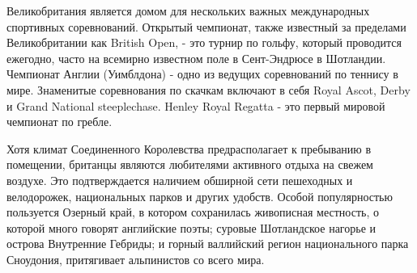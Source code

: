 Великобритания является домом для нескольких важных международных спортивных соревнований. Открытый чемпионат, также известный за пределами Великобритании как British Open, - это турнир по гольфу, который проводится ежегодно, часто на всемирно известном поле в Сент-Эндрюсе в Шотландии. Чемпионат Англии (Уимблдона) - одно из ведущих соревнований по теннису в мире. Знаменитые соревнования по скачкам включают в себя Royal Ascot, Derby и Grand National steeplechase. Henley Royal Regatta - это первый мировой чемпионат по гребле.

Хотя климат Соединенного Королевства предрасполагает к пребыванию в помещении, британцы являются любителями активного отдыха на свежем воздухе. Это подтверждается наличием обширной сети пешеходных и велодорожек, национальных парков и других удобств. Особой популярностью пользуется Озерный край, в котором сохранилась живописная местность, о которой много говорят английские поэты; суровые Шотландское нагорье и острова Внутренние Гебриды; и горный валлийский регион национального парка Сноудония, притягивает альпинистов со всего мира. \cite{britannica}